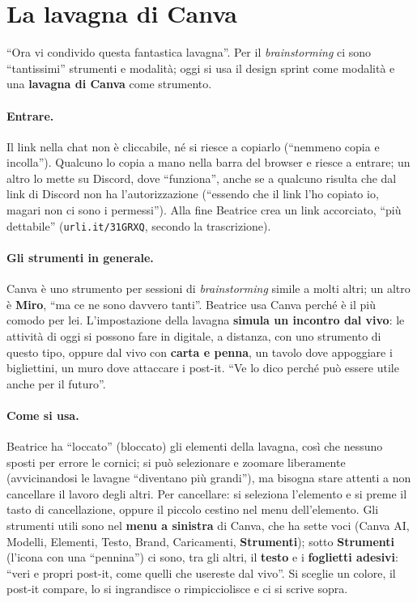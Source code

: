\section{La lavagna di Canva}
\label{a7:sec:canva}

``Ora vi condivido questa fantastica lavagna''. Per il \emph{brainstorming} ci sono
``tantissimi'' strumenti e modalità; oggi si usa il design sprint come modalità e una
\textbf{lavagna di Canva} come strumento.

\paragraph{Entrare.} Il link nella chat non è cliccabile, né si riesce a copiarlo
(``nemmeno copia e incolla''). Qualcuno lo copia a mano nella barra del browser e
riesce a entrare; un altro lo mette su Discord, dove ``funziona'', anche se a qualcuno
risulta che dal link di Discord non ha l'autorizzazione (``essendo che il link l'ho
copiato io, magari non ci sono i permessi''). Alla fine Beatrice crea un link
accorciato, ``più dettabile'' (\texttt{urli.it/31GRXQ}, secondo la trascrizione).

\paragraph{Gli strumenti in generale.} Canva è uno strumento per sessioni di
\emph{brainstorming} simile a molti altri; un altro è \textbf{Miro}, ``ma ce ne sono
davvero tanti''. Beatrice usa Canva perché è il più comodo per lei. L'impostazione
della lavagna \textbf{simula un incontro dal vivo}: le attività di oggi si possono
fare in digitale, a distanza, con uno strumento di questo tipo, oppure dal vivo con
\textbf{carta e penna}, un tavolo dove appoggiare i bigliettini, un muro dove
attaccare i post-it. ``Ve lo dico perché può essere utile anche per il futuro''.

\paragraph{Come si usa.} Beatrice ha ``loccato'' (bloccato) gli elementi della
lavagna, così che nessuno sposti per errore le cornici; si può selezionare e
zoomare liberamente (avvicinandosi le lavagne ``diventano più grandi''), ma bisogna
stare attenti a non cancellare il lavoro degli altri. Per cancellare: si seleziona
l'elemento e si preme il tasto di cancellazione, oppure il piccolo cestino nel menu
dell'elemento. Gli strumenti utili sono nel \textbf{menu a sinistra} di Canva, che ha
sette voci (Canva AI, Modelli, Elementi, Testo, Brand, Caricamenti,
\textbf{Strumenti}); sotto \textbf{Strumenti} (l'icona con una ``pennina'') ci sono,
tra gli altri, il \textbf{testo} e i \textbf{foglietti adesivi}: ``veri e propri
post-it, come quelli che usereste dal vivo''. Si sceglie un colore, il post-it compare,
lo si ingrandisce o rimpicciolisce e ci si scrive sopra.

